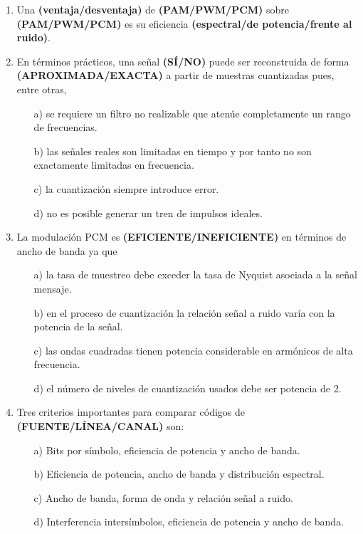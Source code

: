 \begin{enumerate}
\begin{enumerate}
\begin{enumerate}
			\item  
			Una \textbf{(ventaja/desventaja)} de \textbf{(PAM/PWM/PCM)} sobre \textbf{(PAM/PWM/PCM)} es su eficiencia \textbf{(espectral/de potencia/frente al ruido)}.
			\item En términos prácticos, una señal \textbf{(SÍ/NO)} puede ser reconstruida de forma \textbf{(APROXIMADA/EXACTA)} a partir de muestras cuantizadas pues, entre otras, 
			\begin{enumerate}
				\item[a)]	se requiere un filtro no realizable que  atenúe completamente un rango de frecuencias.
				\item[b)]	las señales reales son limitadas en tiempo y por tanto no son exactamente limitadas en frecuencia.
				\item[c)]	la cuantización siempre introduce error.
				\item[d)]	no es posible generar un tren de impulsos ideales.
			\end{enumerate}
			
			\item La modulación PCM es \textbf{(EFICIENTE/INEFICIENTE)} en términos de ancho de banda ya que 
			\begin{enumerate}
				\item[a)]	la tasa de muestreo debe exceder la tasa de Nyquist asociada a la señal mensaje.
				\item[b)]	en el proceso de cuantización la relación señal a ruido varía con la potencia de la señal.
				\item[c)]	las ondas cuadradas tienen potencia considerable en armónicos de alta frecuencia.
				\item[d)]	el número de niveles de cuantización usados debe ser potencia de 2.
			\end{enumerate}
			
			\item Tres criterios importantes para comparar códigos de \textbf{(FUENTE/LÍNEA/CANAL)} son:
			\begin{enumerate}
				\item[a)]	Bits por símbolo, eficiencia de potencia y ancho de banda.
				\item[b)]	Eficiencia de potencia, ancho de banda  y distribución espectral.
				\item[c)]	Ancho de banda, forma de onda y relación señal a ruido.
				\item[d)]	Interferencia intersímbolos, eficiencia de potencia y ancho de banda.
			\end{enumerate}
			

\end{enumerate}
\end{enumerate}
\end{enumerate}
